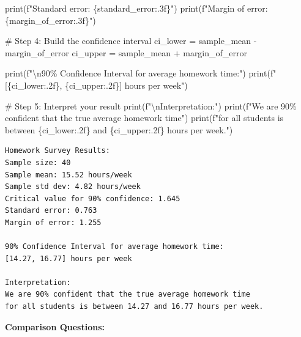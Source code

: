 \documentclass[
  letterpaper,
  DIV=11,
  numbers=noendperiod]{scrartcl}
\newenvironment{Shaded}{\begin{snugshade}}{\end{snugshade}}
\newcommand{\BuiltInTok}[1]{\textcolor[rgb]{0.00,0.23,0.31}{#1}}
\newcommand{\CharTok}[1]{\textcolor[rgb]{0.13,0.47,0.30}{#1}}
\newcommand{\CommentTok}[1]{\textcolor[rgb]{0.37,0.37,0.37}{#1}}
\newcommand{\NormalTok}[1]{\textcolor[rgb]{0.00,0.23,0.31}{#1}}
\newcommand{\OperatorTok}[1]{\textcolor[rgb]{0.37,0.37,0.37}{#1}}
\newcommand{\SpecialCharTok}[1]{\textcolor[rgb]{0.37,0.37,0.37}{#1}}
\newcommand{\SpecialStringTok}[1]{\textcolor[rgb]{0.13,0.47,0.30}{#1}}
\begin{document}
\begin{Shaded}
\begin{Highlighting}[]
\BuiltInTok{print}\NormalTok{(}\SpecialStringTok{f"Standard error: }\SpecialCharTok{\{}\NormalTok{standard\_error}\SpecialCharTok{:.3f\}}\SpecialStringTok{"}\NormalTok{)}
\BuiltInTok{print}\NormalTok{(}\SpecialStringTok{f"Margin of error: }\SpecialCharTok{\{}\NormalTok{margin\_of\_error}\SpecialCharTok{:.3f\}}\SpecialStringTok{"}\NormalTok{)}

\CommentTok{\# Step 4: Build the confidence interval}
\NormalTok{ci\_lower }\OperatorTok{=}\NormalTok{ sample\_mean }\OperatorTok{{-}}\NormalTok{ margin\_of\_error}
\NormalTok{ci\_upper }\OperatorTok{=}\NormalTok{ sample\_mean }\OperatorTok{+}\NormalTok{ margin\_of\_error}

\BuiltInTok{print}\NormalTok{(}\SpecialStringTok{f"}\CharTok{\textbackslash{}n}\SpecialStringTok{90\% Confidence Interval for average homework time:"}\NormalTok{)}
\BuiltInTok{print}\NormalTok{(}\SpecialStringTok{f"[}\SpecialCharTok{\{}\NormalTok{ci\_lower}\SpecialCharTok{:.2f\}}\SpecialStringTok{, }\SpecialCharTok{\{}\NormalTok{ci\_upper}\SpecialCharTok{:.2f\}}\SpecialStringTok{] hours per week"}\NormalTok{)}

\CommentTok{\# Step 5: Interpret your result}
\BuiltInTok{print}\NormalTok{(}\SpecialStringTok{f"}\CharTok{\textbackslash{}n}\SpecialStringTok{Interpretation:"}\NormalTok{)}
\BuiltInTok{print}\NormalTok{(}\SpecialStringTok{f"We are 90\% confident that the true average homework time"}\NormalTok{)}
\BuiltInTok{print}\NormalTok{(}\SpecialStringTok{f"for all students is between }\SpecialCharTok{\{}\NormalTok{ci\_lower}\SpecialCharTok{:.2f\}}\SpecialStringTok{ and }\SpecialCharTok{\{}\NormalTok{ci\_upper}\SpecialCharTok{:.2f\}}\SpecialStringTok{ hours per week."}\NormalTok{)}
\end{Highlighting}
\end{Shaded}

\begin{verbatim}
Homework Survey Results:
Sample size: 40
Sample mean: 15.52 hours/week
Sample std dev: 4.82 hours/week
Critical value for 90% confidence: 1.645
Standard error: 0.763
Margin of error: 1.255

90% Confidence Interval for average homework time:
[14.27, 16.77] hours per week

Interpretation:
We are 90% confident that the true average homework time
for all students is between 14.27 and 16.77 hours per week.
\end{verbatim}

\textbf{Comparison Questions:}
\end{document}
